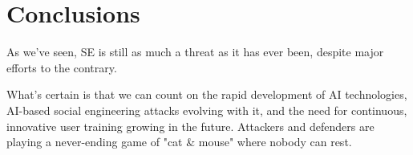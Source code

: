 



\chapter{Conclusions\label{conclusions}}
\begin{comment}
    
Guides:
    - As many pages as it takes (thesis max is around 20 pages)

TODO:
    [ ] How AI has augmented SE attacks and countermeasures
    [ ] Gap in the literature

What to cover:
    - How AI has augmented SE attacks and countermeasures
    - Gap in the literature regarding SE and AI intersection?
    - Analysis on where AI-powered SE attacks might be headed in the future
        - Also about robotics and human-like actors
    - What organizations and individuals need to do regarding the evolving landscape of SE attacks

Speculation:
    - Drones dropping USB thumbdrives?
    - Human-like android as threat actors
    - Impact of robotics on dumpster diving, shoulder surfing and baiting
    
Literature:
    - Gen and detection of deepfakes

From training material:
    - Yhteenveto vaatimattomimmillaan on vain lyhyt kertaus kirjoituksen keskeisistä asioista. Arvokkaamman yhteenvedon saa aikaan kommentoimalla työn tulosten arvoa, työn liittymistä ympäristöön ja tulevaisuudennäkymiä. Tällaiset arviot huolellisesti perusteltava.

\end{comment}


As we've seen, SE is still as much a threat as it has ever been, despite major efforts to the contrary.

What's certain is that we can count on the rapid development of AI technologies, AI-based social engineering attacks evolving with it, and the need for continuous, innovative user training growing in the future. Attackers and defenders are playing a never-ending game of "cat \& mouse" where nobody can rest.





